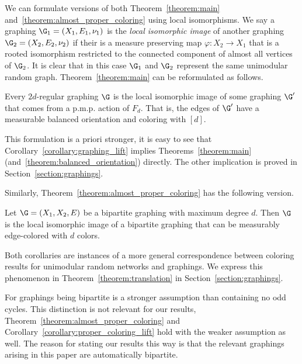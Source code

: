 We can formulate versions of both Theorem~\ref{theorem:main} and~\ref{theorem:almost_proper_coloring} using local isomorphisms. We say a graphing $\G_1=(X_1, E_1, \nu_1)$ is the \emph{local isomorphic image} of another graphing $\G_2=(X_2, E_2, \nu_2)$ if their is a measure preserving map $\varphi: X_2 \to X_1$ that is a rooted isomorphism restricted to the connected component of almost all vertices of $\G_2$. It is clear that in this case $\G_1$ and $\G_2$ represent the same unimodular random graph. Theorem~\ref{theorem:main} can be reformulated as follows.

\begin{coro}\label{corollary:graphing_lift}
Every $2d$-regular graphing $\G$ is the local isomorphic image of some graphing $\G'$ that comes from a p.m.p. action of $F_d$. That is, the edges of $\G'$ have a measurable balanced orientation and coloring with $[d]$.
\end{coro}

This formulation is a priori stronger, it is easy to see that Corollary~\ref{corollary:graphing_lift} implies Theorems~\ref{theorem:main} (and~\ref{theorem:balanced_orientation}) directly. The other implication is proved in Section~\ref{section:graphings}.

Similarly, Theorem~\ref{theorem:almost_proper_coloring} has the following version.

\begin{coro}\label{corollary:proper_coloring_lift}
Let $\G=(X_1,X_2,E)$ be a bipartite graphing with maximum degree $d$. Then $\G$ is the local isomorphic image of a bipartite graphing that can be measurably edge-colored with $d$ colors.
\end{coro}

\noindent Both corollaries are instances of a more general correspondence between coloring results for unimodular random networks and graphings. We express this phenomenon in Theorem~\ref{theorem:translation} in Section~\ref{section:graphings}.

\begin{rema*}
For graphings being bipartite is a stronger assumption than containing no odd cycles. This distinction is not relevant for our results, Theorem~\ref{theorem:almost_proper_coloring} and Corollary~\ref{corollary:proper_coloring_lift} hold with the weaker assumption as well. The reason for stating our results this way is that the relevant graphings arising in this paper are automatically bipartite.
\end{rema*}

